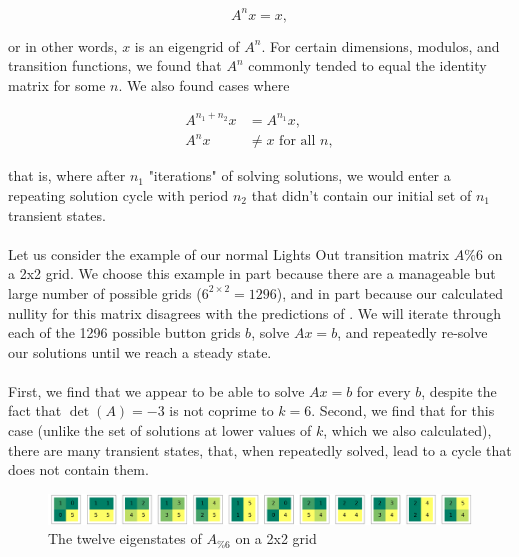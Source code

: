 \documentclass[11pt]{article}
\begin{document}
\begin{equation}
A^nx = x,
\end{equation}

\noindent or in other words, $x$ is an eigengrid of $A^n$. For certain dimensions, modulos, and transition functions, we found that $A^n$ commonly tended to equal the identity matrix for some $n$. We also found cases where

\begin{equation}
\begin{split}
  A^{n_1 + n_2}x & = A^{n_1}x,\\
  A^{n}x & \neq x \text{ for all } n,
\end{split}
\end{equation}

\noindent that is, where after $n_1$ "iterations" of solving solutions, we would enter a repeating solution cycle with period $n_2$ that didn't contain our initial set of $n_1$ transient states.

\paragraph{} Let us consider the example of our normal Lights Out transition matrix $A \% 6$ on a 2x2 grid. We choose this example in part because there are a manageable but large number of possible grids ($6^{2 \times 2} = 1296$), and in part because our calculated nullity for this matrix disagrees with the predictions of \cite{involve}. We will iterate through each of the 1296 possible button grids $b$, solve $Ax=b$, and repeatedly re-solve our solutions until we reach a steady state.

\paragraph{} First, we find that we appear to be able to solve $Ax=b$ for every $b$, despite the fact that $\det(A) = -3$ is not coprime to $k=6$. Second, we find that for this case (unlike the set of solutions at lower values of $k$, which we also calculated), there are many transient states, that, when repeatedly solved, lead to a cycle that does not contain them.



\begin{figure}
\caption{The twelve eigenstates of $A_{\% 6}$ on a 2x2 grid}
\label{eig622}
\includegraphics[width=\textwidth]{eig622.png}
\end{figure}
\end{document}
